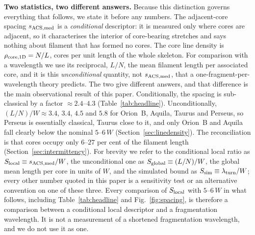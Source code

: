 \documentclass[usenatbib,twoside,twocolumn]{mnras}
\begin{document}
\smallskip\noindent\textbf{Two statistics, two different answers.} Because this distinction governs everything that follows, we state it before any numbers. The adjacent-core spacing $s_{\rm ACS,med}$ is a \emph{conditional} descriptor: it is measured only where cores are adjacent, so it characterises the interior of core-bearing stretches and says nothing about filament that has formed no cores. The core line density is $\rho_{\rm core,1D}=N/L$, cores per unit length of the whole skeleton. For comparison with a wavelength we use its reciprocal, $L/N$, the mean filament length per associated core, and it is this \emph{unconditional} quantity, not $s_{\rm ACS,med}$, that a one-fragment-per-wavelength theory predicts. The two give different answers, and that difference is the main observational result of this paper. Conditionally, the spacing is sub-classical by a factor $\approx2.4$--$4.3$ (Table~\ref{tab:headline}). Unconditionally, $(L/N)/W\approx3.4$, $3.4$, $4.5$ and $5.8$ for Orion~B, Aquila, Taurus and Perseus, so Perseus is essentially classical, Taurus close to it, and only Orion~B and Aquila fall clearly below the nominal $5$--$6\,W$ (Section~\ref{sec:linedensity}). The reconciliation is that cores occupy only $6$--$27$ per cent of the filament length (Section~\ref{sec:intermittency}). For brevity we refer to the conditional local ratio as $S_{\rm local}\equiv s_{\rm ACS,med}/W$, the unconditional one as $S_{\rm global}\equiv(L/N)/W$, the global mean length per core in units of $W$, and the simulated bound as $S_{\rm sim}\equiv\lambda_{\rm turn}/W$; every other number quoted in this paper is a sensitivity test or an alternative convention on one of these three. Every comparison of $S_{\rm local}$ with $5$--$6\,W$ in what follows, including Table~\ref{tab:headline} and Fig.~\ref{fig:spacing}, is therefore a comparison between a conditional local descriptor and a fragmentation wavelength. It is not a measurement of a shortened fragmentation wavelength, and we do not use it as one.
\end{document}
